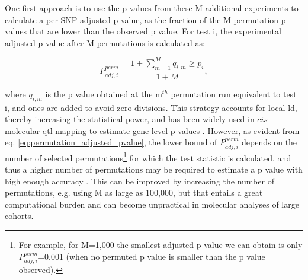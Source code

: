 One first approach is to use the
p values from these M additional experiments
to calculate a per-SNP adjusted p value, as the fraction of the M permutation-p values that are lower than the observed p value. 
For test i, the experimental adjusted p value after M permutations is calculated as:

\begin{equation}\label{eq:permutation_adjusted_pvalue}
    P_{adj,i}^{perm} = \frac{1+\sum_{m=1}^{M} q_{i,m} \geq p_i}{1+M},
\end{equation}

where $q_{i,m}$ is the p value obtained at the m$^{th}$ permutation run equivalent to test i, and ones are added to avoid zero divisions.  
This strategy accounts for local \gls{ld}, thereby increasing the statistical power, and has been widely used in $cis$ molecular \gls{qtl} mapping to estimate gene-level p values \cite{gtex2015genotype, sudmant2015integrated}. 
However, as evident from eq. \eqref{eq:permutation_adjusted_pvalue}, the lower bound of $P_{adj,i}^{perm}$ depends on the number of selected permutations\footnote{For example, for M=1,000 the smallest adjusted p value we can obtain is only $P_{adj,i}^{perm}$=0.001 (when no permuted p value is smaller than the p value observed).} for which the test statistic is calculated, and thus a higher number of permutations may be required to estimate a p value with high enough accuracy \cite{sul2015accurate}.
This can be improved by increasing the number of permutations, e.g. using M as large as 100,000, but that entails a great computational burden and can become unpractical in molecular analyses of large cohorts.
\\

